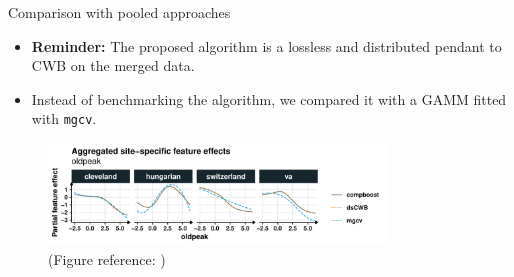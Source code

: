 \documentclass[t,10pt]{beamer}
\begin{document}
\begin{frame}{Comparison with pooled approaches}
  \begin{itemize}
    \item \textbf{Reminder:} The proposed algorithm is a lossless and distributed pendant to CWB on the merged data.
    \item Instead of benchmarking the algorithm, we compared it with a GAMM fitted with \texttt{mgcv}.
  \end{itemize}
  \begin{figure}
    \centering
    \includegraphics[width=0.8\textwidth]{figures/fig-dcwb-effect-comparison.pdf}
    \caption{\small(Figure reference: \citet{schalk2022distcwb})}
  \end{figure}
\end{frame}


\end{document}
